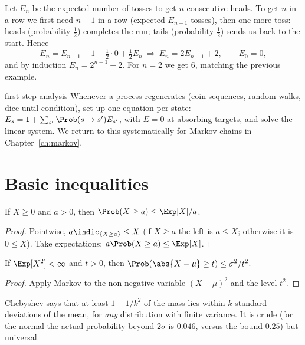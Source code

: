\begin{example}\label{ex:nheads}
Let $E_n$ be the expected number of tosses to get $n$ consecutive heads. To get $n$
in a row we first need $n-1$ in a row (expected $E_{n-1}$ tosses), then one more
toss: heads (probability $\tfrac12$) completes the run; tails (probability
$\tfrac12$) sends us back to the start. Hence
\[
E_n=E_{n-1}+1+\tfrac12\cdot0+\tfrac12E_n\ \Longrightarrow\ E_n=2E_{n-1}+2,
\qquad E_0=0,
\]
and by induction $E_n=2^{n+1}-2$. For $n=2$ we get $6$, matching the previous example.
\end{example}

\begin{interview}{first-step analysis}
Whenever a process regenerates (coin sequences, random walks, dice-until-condition),
set up one equation per state: $E_s=1+\sum_{s'}\Prob(s\to s')E_{s'}$, with $E=0$ at
absorbing targets, and solve the linear system. We return to this systematically for
Markov chains in Chapter~\ref{ch:markov}.
\end{interview}

\section{Basic inequalities}

\begin{theorem}\label{thm:markov}
If $X\ge0$ and $a>0$, then $\Prob(X\ge a)\le\Exp[X]/a$.
\end{theorem}
\begin{proof}
Pointwise, $a\indic_{\{X\ge a\}}\le X$ (if $X\ge a$ the left is $a\le X$; otherwise it
is $0\le X$). Take expectations: $a\Prob(X\ge a)\le\Exp[X]$.
\end{proof}

\begin{theorem}\label{thm:chebyshev}
If $\Exp[X^2]<\infty$ and $t>0$, then $\Prob(\abs{X-\mu}\ge t)\le\sigma^2/t^2$.
\end{theorem}
\begin{proof}
Apply Markov to the non-negative variable $(X-\mu)^2$ and the level $t^2$.
\end{proof}

Chebyshev says that at least $1-1/k^2$ of the mass lies within $k$ standard
deviations of the mean, for \emph{any} distribution with finite variance. It is
crude (for the normal the actual probability beyond $2\sigma$ is $0.046$, versus the
bound $0.25$) but universal.

